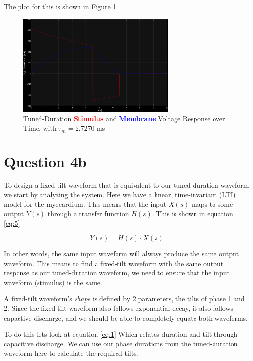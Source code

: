 \documentclass[]{report}
\begin{document}
The plot for this is shown in Figure \ref{fig:7}

\begin{figure}[H]
	\centering
	\includegraphics[width=0.7\textwidth]{q4_response.png}
	\caption{\centering Tuned-Duration \textcolor{red}{\textbf{Stimulus}} and \textcolor{blue}{\textbf{Membrane}} Voltage Response over Time, with $\tau_m = 2.7270$ ms}
	\label{fig:7}
\end{figure}

\section*{Question 4b}

To design a fixed-tilt waveform that is equivalent to our tuned-duration waveform we start by analyzing the system. Here we have a linear, time-invariant (LTI) model for the myocardium. This means that the input $X(s)$ maps to some output $Y(s)$ through a transfer function $H(s)$. This is shown in equation \ref{eq:5}

\begin{equation}
\label{eq:5}
Y(s) = H(s) \cdot X(s)
\end{equation}

In other words, the same input waveform will always produce the same output waveform. This means to find a fixed-tilt waveform with the same output response as our tuned-duration waveform, we need to ensure that the input waveform (stimulus) is the same.

A fixed-tilt waveform's \textit{shape} is defined by 2 parameters, the tilts of phase 1 and 2. Since the fixed-tilt waveform also follows exponential decay, it also follows capactive discharge, and we should be able to completely equate both waveforms.

To do this lets look at equation \ref{eq:1} Which relates duration and tilt through capacitive discharge. We can use our phase durations from the tuned-duration waveform here to calculate the required tilts.
\end{document}
